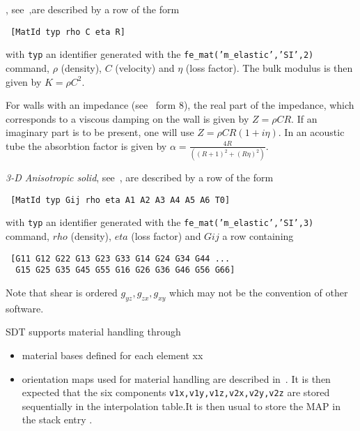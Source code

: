  , see~,are described by a row of the form

\begin{verbatim}
 [MatId typ rho C eta R]
\end{verbatim}


\noindent with {\tt typ} an identifier generated with the {\tt fe\_mat('m\_elastic','SI',2)} command, $\rho$ (density), $C$ (velocity) and $\eta$ (loss factor). The bulk modulus is then given by $K=\rho C^2$. 

For walls with an impedance (see~ form 8), the real part of the impedance, which corresponds to a viscous damping on the wall is given by {\tt $Z=\rho C R$}. If an imaginary part is to be present, one will use $Z=\rho C R(1+i \eta)$. In an acoustic tube the absorbtion factor is given by $\alpha=\frac{4R}{((R+1)^2+(R\eta)^2)}$. 


{\sl 3-D Anisotropic solid}, see~, are described by a row of the form

\begin{verbatim}
 [MatId typ Gij rho eta A1 A2 A3 A4 A5 A6 T0]
\end{verbatim}


with {\tt typ} an identifier generated with the {\tt fe\_mat('m\_elastic','SI',3)} command, $rho$ (density), $eta$ (loss factor) and $Gij$ a row containing 

\begin{verbatim}
 [G11 G12 G22 G13 G23 G33 G14 G24 G34 G44 ...
  G15 G25 G35 G45 G55 G16 G26 G36 G46 G56 G66]
\end{verbatim}

Note that shear is ordered $g_{yz}, g_{zx}, g_{xy}$ which may not be the convention of other software.

SDT supports material handling through 

\begin{itemize}
\item material bases defined for each element xx
\item orientation maps used for material handling are described in~. It is then expected that the six components {\tt v1x,v1y,v1z,v2x,v2y,v2z} are stored sequentially in the interpolation table.It is then usual to store the MAP in the stack entry .
\end{itemize}


